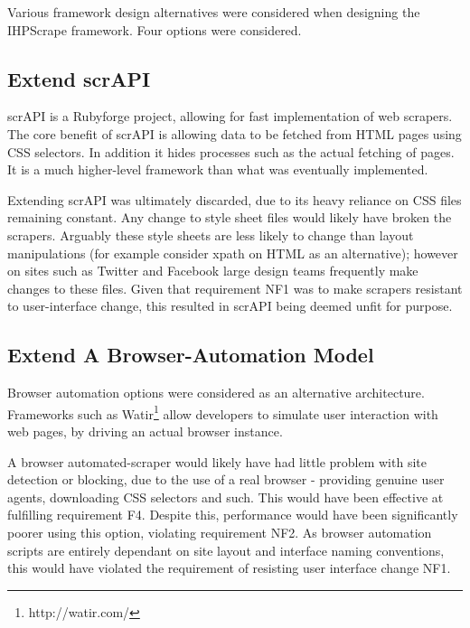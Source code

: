 Various framework design alternatives were considered when designing the IHPScrape framework. Four options were considered.

% 

\subsection{Extend scrAPI}
scrAPI is a Rubyforge project, allowing for fast implementation of web scrapers. The core benefit of scrAPI is allowing data to be fetched from HTML pages using CSS selectors. In addition it hides processes such as the actual fetching of pages. It is a much higher-level framework than what was eventually implemented.

Extending scrAPI was ultimately discarded, due to its heavy reliance on CSS files remaining constant. Any change to style sheet files would likely have broken the scrapers. Arguably these style sheets are less likely to change than layout manipulations (for example consider xpath on HTML as an alternative); however on sites such as Twitter and Facebook large design teams frequently make changes to these files. Given that requirement NF1 was to make scrapers resistant to user-interface change, this resulted in scrAPI being deemed unfit for purpose. 

\subsection{Extend A Browser-Automation Model}

Browser automation options were considered as an alternative architecture. Frameworks such as Watir\footnote{http://watir.com/} allow developers to simulate user interaction with web pages, by driving an actual browser instance.

A browser automated-scraper would likely have had little problem with site detection or blocking, due to the use of a real browser - providing genuine user agents, downloading CSS selectors and such. This would have been effective at fulfilling requirement F4. Despite this, performance would have been significantly poorer using this option, violating requirement NF2. As browser automation scripts are entirely dependant on site layout and interface naming conventions, this would have violated the requirement of resisting user interface change NF1. 

